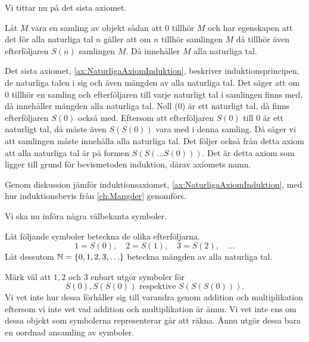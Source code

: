 Vi tittar nu på det sista axiomet.
\begin{axiom}[Induktionsaxiomet]\label{ax:NaturligaAxiomInduktion}
  Låt \(M\) vara en samling av objekt sådan att \(0\) tillhör \(M\) och har
  egenskapen att det för alla naturliga tal \(n\) gäller att om \(n\) tillhör
  samlingen \(M\) då tillhör även efterföljaren \(S(n)\) samlingen \(M\).
  Då innehåller \(M\) alla naturliga tal.
\end{axiom}
Det sista axiomet, \cref{ax:NaturligaAxiomInduktion}, beskriver
induktionsprincipen, de naturliga talen i sig och även mängden av alla
naturliga tal.
Det säger att om \(0\) tillhör en samling och efterföljaren till varje
naturligt tal i samlingen finns med, då innehåller mängden alla
naturliga tal.
Noll (\(0\)) är ett naturligt tal, då finns efterföljaren \(S(0)\) också med.
Eftersom att efterföljaren \(S(0)\) till \(0\) är ett naturligt tal, då måste
även \(S(S(0))\) vara med i denna samling.
Då säger vi att samlingen måste innehålla alla naturliga tal.
Det följer också från detta axiom att alla naturliga tal är på formen
\(S(S(\ldots S(0)))\).
Det är detta axiom som ligger till grund för bevismetoden induktion, därav
axiomets namn.
\begin{exercise}
  Genom diskussion jämför induktionsaxiomet,
  \cref{ax:NaturligaAxiomInduktion}, med hur induktionsbevis från
  \cref{ch:Mangder} genomförs.
\end{exercise}

Vi ska nu införa några välbekanta symboler.
\begin{definition}\label{def:NaturligaBeteckningar}
  Låt följande symboler beteckna de olika efterföljarna.
  \begin{equation*}
    1 = S(0),\quad
    2 = S(1),\quad
    3 = S(2),\quad
    \ldots
  \end{equation*}
  Låt dessutom \(\mathbb{N}=\{0,1,2,3,\ldots\}\) beteckna mängden av alla naturliga
  tal.
\end{definition}
\begin{remark}
  Märk väl att \(1,2\) och \(3\) enbart utgör symboler för
  \[
  S(0),S(S(0))\text{ respektive }S(S(S(0))).
  \]
  Vi vet inte hur dessa förhåller sig till varandra genom addition och
  multiplikation eftersom vi inte vet vad addition och multiplikation är
  ännu.
  Vi vet inte ens om dessa objekt som symbolerna representerar går att räkna.
  Ännu utgör dessa bara en oordnad ansamling av symboler.
\end{remark}

